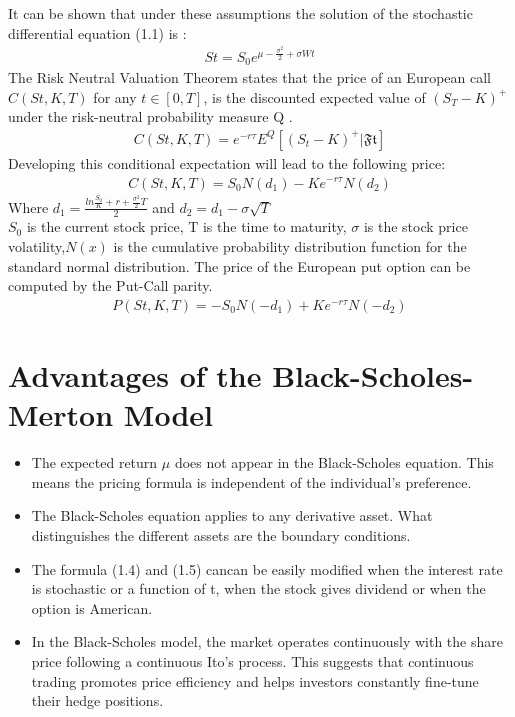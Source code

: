 \documentclass[12pt]{report}
\begin{document}
It can be shown that under these assumptions the solution of the stochastic differential equation (1.1) is :
\begin{gather}
St= S_0 e^{\mu-\frac{\sigma^2}{2}+\sigma Wt}
\end{gather}
The Risk Neutral Valuation Theorem  states that the price of an 
European call $C(St, K,T)$ for any $ t \in [0, T]$, is the discounted expected value of $(S_T-K)^+$ under the risk-neutral probability measure Q .
\begin{gather}
C(St, K,T)= e^{-r \tau} E^Q[(S_t-K)^+|\mathfrak{Ft}] 
\end{gather}
Developing this conditional expectation will lead to the following price:
\begin{gather}
C(St,K,T)= S_0 N(d_1) - K e^{-r \tau} N(d_2)
\end{gather}
Where $ d_1= \frac{ln\frac{S_0}{K}+r+\frac{\sigma^2}{2}T}{2} $ and $d_2 = d_1-\sigma \sqrt{T} $ \\
$ S_0$ is the current stock price, T is the time to maturity, $\sigma$ is the stock price volatility,$N(x)$ is the cumulative probability distribution function for the standard normal distribution. The price of the European put option can
be computed by the Put-Call parity. 
\begin{gather}
P(St,K,T)= -S_0 N(-d_1) + K e^{-r \tau} N(-d_2)
\end{gather}
\section{Advantages of the Black-Scholes-Merton Model}
\begin{itemize}
\item The expected return $\mu$ does not appear in the Black-Scholes equation. This means the pricing formula is independent of the individual’s preference. 
\item The Black-Scholes equation applies to any derivative asset.  What distinguishes the different assets are the boundary conditions.
\item The formula (1.4) and (1.5) cancan be easily modified when the interest rate is stochastic or a function of t, when the stock gives dividend or when the
option is American.
\item  In the Black-Scholes model, the market operates continuously with the share price following a continuous Ito’s process.  This suggests that continuous trading promotes price efficiency and helps investors constantly fine-tune their hedge positions. 
\end{itemize}
\end{document}
